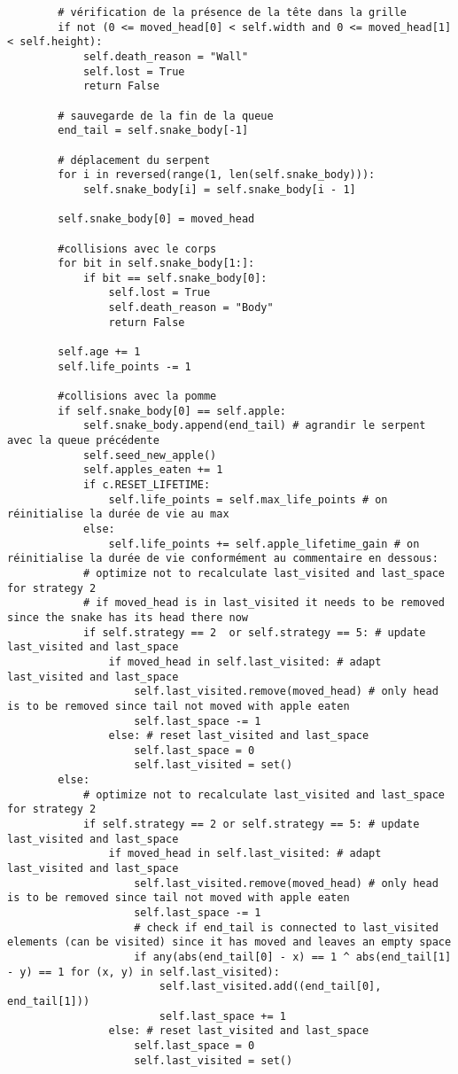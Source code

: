 \documentclass[11pt,a4paper]{article}
\begin{document}
\begin{verbatim}
        # vérification de la présence de la tête dans la grille
        if not (0 <= moved_head[0] < self.width and 0 <= moved_head[1] < self.height):
            self.death_reason = "Wall"
            self.lost = True
            return False

        # sauvegarde de la fin de la queue
        end_tail = self.snake_body[-1]

        # déplacement du serpent
        for i in reversed(range(1, len(self.snake_body))):
            self.snake_body[i] = self.snake_body[i - 1]

        self.snake_body[0] = moved_head

        #collisions avec le corps
        for bit in self.snake_body[1:]:
            if bit == self.snake_body[0]:
                self.lost = True
                self.death_reason = "Body"
                return False

        self.age += 1
        self.life_points -= 1

        #collisions avec la pomme
        if self.snake_body[0] == self.apple:
            self.snake_body.append(end_tail) # agrandir le serpent avec la queue précédente
            self.seed_new_apple()
            self.apples_eaten += 1
            if c.RESET_LIFETIME:
                self.life_points = self.max_life_points # on réinitialise la durée de vie au max
            else:
                self.life_points += self.apple_lifetime_gain # on réinitialise la durée de vie conformément au commentaire en dessous:
            # optimize not to recalculate last_visited and last_space for strategy 2
            # if moved_head is in last_visited it needs to be removed since the snake has its head there now
            if self.strategy == 2  or self.strategy == 5: # update last_visited and last_space
                if moved_head in self.last_visited: # adapt last_visited and last_space
                    self.last_visited.remove(moved_head) # only head is to be removed since tail not moved with apple eaten
                    self.last_space -= 1
                else: # reset last_visited and last_space
                    self.last_space = 0
                    self.last_visited = set()
        else:
            # optimize not to recalculate last_visited and last_space for strategy 2
            if self.strategy == 2 or self.strategy == 5: # update last_visited and last_space
                if moved_head in self.last_visited: # adapt last_visited and last_space
                    self.last_visited.remove(moved_head) # only head is to be removed since tail not moved with apple eaten
                    self.last_space -= 1
                    # check if end_tail is connected to last_visited elements (can be visited) since it has moved and leaves an empty space
                    if any(abs(end_tail[0] - x) == 1 ^ abs(end_tail[1] - y) == 1 for (x, y) in self.last_visited):
                        self.last_visited.add((end_tail[0], end_tail[1]))
                        self.last_space += 1
                else: # reset last_visited and last_space
                    self.last_space = 0
                    self.last_visited = set()


\end{verbatim}
\end{document}
